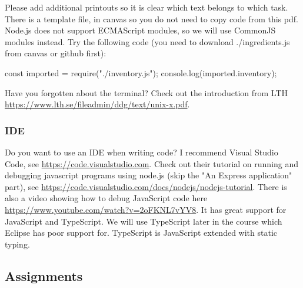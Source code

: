 \documentclass[fleqn, article, a4paper]{memoir}
\begin{document}
\noindent Please add additional printouts so it is clear which text belongs to which task. There is a template file,  in canvas so you do not need to copy code from this pdf. Node.js does not support ECMAScript modules, so we will use CommonJS modules instead. Try the following code (you need to download ./ingredients.js from canvas or github first):
\begin{Code}
  const imported = require("./inventory.js");
  console.log(imported.inventory);
\end{Code}

\noindent Have you forgotten about the terminal? Check out the introduction from LTH \url{https://www.lth.se/fileadmin/ddg/text/unix-x.pdf}.

\subsubsection*{IDE}

\noindent Do you want to use an IDE when writing code? I recommend Visual Studio Code, see \url{https://code.visualstudio.com}. Check out their tutorial on running and debugging javascript programs using node.js (skip the "An Express application" part), see \url{https://code.visualstudio.com/docs/nodejs/nodejs-tutorial}. There is also a video showing how to debug JavaScript code here \url{https://www.youtube.com/watch?v=2oFKNL7vYV8}. It has great support for JavaScript and TypeScript. We will use TypeScript later in the course which Eclipse has poor support for. TypeScript is JavaScript extended with static typing.

\subsection*{Assignments}
\end{document}
